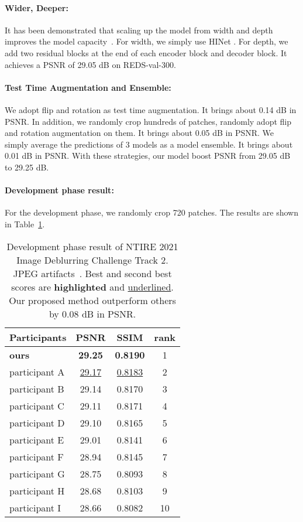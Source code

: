 \documentclass[final]{cvpr}
\newcommand{\tablestyle}[2]{\setlength{\tabcolsep}{#1}\renewcommand{\arraystretch}{#2}\centering\footnotesize}
\begin{document}
\paragraph{Wider, Deeper:} 
It has been demonstrated that scaling up the model from width and depth improves the model capacity~\cite{tan2019efficientnet,yu2018wide}. For width, we simply use HINet . For depth, we add two residual blocks at the end of each encoder block and decoder block.
It achieves a PSNR of 29.05 dB on REDS-val-300.

\paragraph{Test Time Augmentation and Ensemble:}
We adopt flip and rotation as test time augmentation. It brings about 0.14 dB in PSNR. In addition, we randomly crop hundreds of patches, randomly adopt flip and rotation augmentation on them. It brings about 0.05 dB in PSNR. We simply average the predictions of 3 models as a model ensemble. It brings about 0.01 dB in PSNR. With these strategies, our model boost PSNR from 29.05 dB to 29.25 dB.

\paragraph{Development phase result:}
For the development phase, we randomly crop 720 patches. The results are shown in Table~\ref{result.devphase}.

\begin{table}[]
    \centering
    \tablestyle{5pt}{1.05}\setlength{\tabcolsep}{1.mm}\begin{tabular}{l|ccc}
    Participants & PSNR & SSIM & rank\\
    \hline
        \textbf{ours} & \textbf{29.25} & \textbf{0.8190} & 1 \\
         participant A & \underline{29.17} & \underline{0.8183} & 2\\
         participant B & 29.14 & 0.8170 & 3\\
         participant C & 29.11 & 0.8171 & 4\\
         participant D & 29.10 & 0.8165 & 5\\
         participant E & 29.01 & 0.8141 & 6\\
         participant F & 28.94 & 0.8145 & 7\\
         participant G & 28.75 & 0.8093 & 8\\
         participant H & 28.68 & 0.8103 & 9\\
         participant I & 28.66 & 0.8082 & 10\\
    \end{tabular}
    \vspace{-0.1cm}
    \caption{Development phase result of NTIRE 2021 Image Deblurring Challenge Track 2. JPEG artifacts~\cite{nah2021ntire}. Best and second best scores are \textbf{highlighted} and \underline{underlined}. Our proposed method outperform others by 0.08 dB in PSNR.}
    \label{result.devphase}
\end{table}
\end{document}
